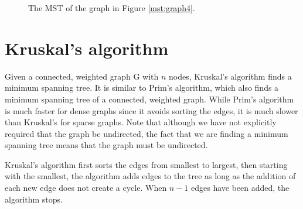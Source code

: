 \begin{figure}[H]
\caption{The MST of the graph in Figure \ref{mst:graph4}.}
\label{mst:graph5}
\end{figure}

\section*{Kruskal's algorithm}

Given a connected, weighted graph G with $n$ nodes, Kruskal's algorithm finds a minimum spanning tree. It is similar to Prim's algorithm, which also finds a minimum spanning tree of a connected, weighted graph. While Prim's algorithm is much faster for dense graphs since it avoids sorting the edges, it is much slower than Kruskal's for sparse graphs. Note that although we have not explicitly required that the graph be undirected, the fact that we are finding a minimum spanning tree means that the graph must be undirected.

Kruskal's algorithm first sorts the edges from smallest to largest, then starting with the smallest, the algorithm adds edges to the tree as long as the addition of each new edge does not create a cycle.
When $n-1$ edges have been added, the algorithm stops.

